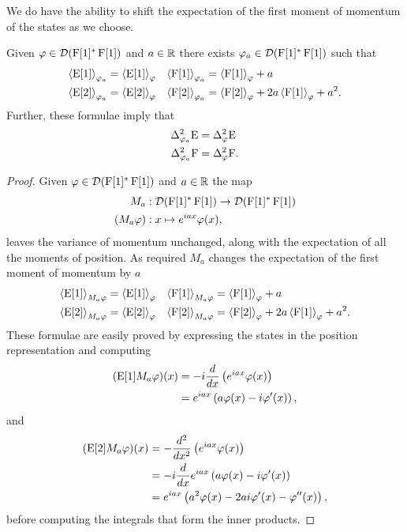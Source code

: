 We do have the ability to shift the expectation of the first moment of momentum of the states as we choose. 
\begin{lem}\label{lem:infinite-dim-ur-shift-momentum}
  Given $\varphi\in\mathcal{D}(\operatorname{F}[1]^*\operatorname{F}[1])$ and $a\in\mathbb{R}$ there exists $\varphi_a\in\mathcal{D}(\operatorname{F}[1]^*\operatorname{F}[1])$ such that
  \begin{align}
    \left\langle{\operatorname{E}[1]}\right\rangle_{\varphi_a} &= \left\langle{\operatorname{E}[1]}\right\rangle_{\varphi} & \left\langle{\operatorname{F}[1]}\right\rangle_{\varphi_a} &= \left\langle{\operatorname{F}[1]}\right\rangle_{\varphi} + a\\
    \left\langle{\operatorname{E}[2]}\right\rangle_{\varphi_a} &= \left\langle{\operatorname{E}[2]}\right\rangle_{\varphi}& \left\langle{\operatorname{F}[2]}\right\rangle_{\varphi_a} &= \left\langle{\operatorname{F}[2]}\right\rangle_{\varphi} + 2a\left\langle{\operatorname{F}[1]}\right\rangle_{\varphi} + a^2.
  \end{align}
  Further, these formulae imply that
  \begin{align}
    \var[\varphi_a]{\ope} &= \var[\varphi]{\ope}\\
    \var[\varphi_a]{\opf} &= \var[\varphi]{\opf}.
  \end{align}
\end{lem}
\begin{proof}
Given $\varphi\in\mathcal{D}(\operatorname{F}[1]^*\operatorname{F}[1])$ and $a\in\mathbb{R}$ the map
\begin{align}
  M_a &:\mathcal{D}(\operatorname{F}[1]^*\operatorname{F}[1])\to\mathcal{D}(\operatorname{F}[1]^*\operatorname{F}[1])\\
  (M_a\varphi)&:x\mapsto e^{i a x}\varphi(x),
\end{align}
leaves the variance of momentum unchanged, along with the expectation of all the moments of position. As required $M_a$ changes the expectation of the first moment of momentum by $a$
\begin{align}
  \left\langle{\operatorname{E}[1]}\right\rangle_{M_a\varphi} &= \left\langle{\operatorname{E}[1]}\right\rangle_{\varphi} & \left\langle{\operatorname{F}[1]}\right\rangle_{M_a\varphi} &= \left\langle{\operatorname{F}[1]}\right\rangle_{\varphi} + a\\
  \left\langle{\operatorname{E}[2]}\right\rangle_{M_a\varphi} &= \left\langle{\operatorname{E}[2]}\right\rangle_{\varphi}& \left\langle{\operatorname{F}[2]}\right\rangle_{M_a\varphi} &= \left\langle{\operatorname{F}[2]}\right\rangle_{\varphi} + 2a\left\langle{\operatorname{F}[1]}\right\rangle_{\varphi} + a^2.
\end{align}
These formulae are easily proved by expressing the states in the position representation and computing
\begin{align}
  (\operatorname{E}[1]M_a\varphi)(x) &= -i \frac{d}{dx}\left(e^{iax}\varphi(x)\right)\\
                         &= e^{iax}\left(a\varphi(x) -i\varphi^\prime(x)\right),
\end{align}
and
\begin{align}
  (\operatorname{E}[2]M_a\varphi)(x) &= - \frac{d^2}{dx^2}\left(e^{iax}\varphi(x)\right)\\
                         &= -i\frac{d}{dx} e^{iax}\left(a\varphi(x) -i\varphi^\prime(x)\right)\\
                         &= e^{iax}\left(a^2\varphi(x) -2 a i\varphi^\prime(x)- \varphi^{\prime\prime}(x)\right),
\end{align}
before computing the integrals that form the inner products.
\end{proof}
